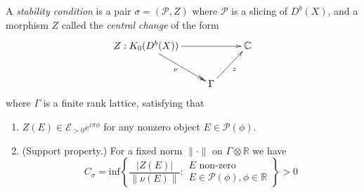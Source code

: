 \begin{definition}
\label{definition-Bridgeland-stability-condition}
A {\it stability condition} is a pair $\sigma=(\mathcal{P},Z)$ where
$\mathcal{P}$ is a slicing of $D^b(X)$, and a morphism $Z$ called the  {\it
central change} of the form
$$
\xymatrix{
Z:K_0(D^b(X))\ar[rr]\ar@{->>}[dr]_\nu&  &  \mathbb{C}\\
&  \Gamma \ar[ur]_z
}
$$
where $\Gamma$ is a finite rank lattice, satisfying that
\begin{enumerate}
\item $Z(E) \in \mathcal{E}_{>0}e^{i\pi \phi}$ for any nonzero object $E \in
\mathcal{P}(\phi)$.
\item (Support property.) 
For a fixed norm $\|\cdot\|$ on $\Gamma \otimes \mathbb{R}$ we have
$$
C_{\sigma}=\text{inf}\left\{ \frac{|Z(E)|}{\|\nu(E)\|}:\substack{
\text{$E$ non-zero} \\ E \in \mathcal{P}(\phi),\phi \in \mathbb{R}} \right\} >0
$$
\end{enumerate}
\end{definition}

